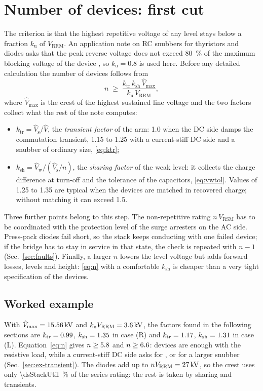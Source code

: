 \documentclass[10pt,a4paper]{scrartcl}
\newcommand{\Vrrm}{V_\mathrm{RRM}}
\newcommand{\Vrsm}{V_\mathrm{RSM}}
\newcommand{\Vh}{\hat V}
\newcommand{\Vs}{\hat V_\mathrm{s}}
\newcommand{\Vw}{\hat V_\mathrm{w}}
\newcommand{\ku}{k_\mathrm{u}}
\newcommand{\ktr}{k_\mathrm{tr}}
\newcommand{\ksh}{k_\mathrm{sh}}
\newcommand{\caseR}{(R)}
\newcommand{\caseL}{(L)}
\begin{document}
\section{Number of devices: first cut}
\label{sec:number}
The criterion is that the highest repetitive voltage of any level stays below a fraction $\ku$ of $\Vrrm$. An application note on RC snubbers for thyristors and diodes asks that the peak reverse voltage does not exceed \SI{80}{\percent} of the maximum blocking voltage of the device \cite[Sec.~4.4]{an6481}, so $\ku = 0.8$ is used here. Before any detailed calculation the number of devices follows from
\begin{equation}
n \;\ge\; \frac{\ktr\,\ksh\,\Vh_\mathrm{max}}{\ku\,\Vrrm},
\label{eq:n}
\end{equation}
where $\Vh_\mathrm{max}$ is the crest of the highest sustained line voltage and the two factors collect what the rest of the note computes:
\begin{itemize}
\item $\ktr = \Vs/\Vh$, the \emph{transient factor} of the arm: 1.0 when the DC side damps the commutation transient, 1.15 to 1.25 with a current-stiff DC side and a snubber of ordinary size, \eqref{eq:ktr};
\item $\ksh = \Vw/(\Vs/n)$, the \emph{sharing factor} of the weak level: it collects the charge difference at turn-off and the tolerance of the capacitors, \eqref{eq:vwtol}. Values of 1.25 to 1.35 are typical when the devices are matched in recovered charge; without matching it can exceed 1.5.
\end{itemize}
Three further points belong to this step. The non-repetitive rating $n\,\Vrsm$ has to be coordinated with the protection level of the surge arresters on the AC side. Press-pack diodes fail short, so the stack keeps conducting with one failed device; if the bridge has to stay in service in that state, the check is repeated with $n - 1$ (Sec.~\ref{sec:faults}). Finally, a larger $n$ lowers the level voltage but adds forward losses, levels and height: \eqref{eq:n} with a comfortable $\ksh$ is cheaper than a very tight specification of the devices.

\subsection{Worked example}
With $\Vh_\mathrm{max} = \SI{\dsVhatMax}{\kilo\volt}$ and $\ku\Vrrm = \SI{\dsKuVrrm}{\kilo\volt}$, the factors found in the following sections are $\ktr = \dsKtrR$, $\ksh = \dsKshR$ in case \caseR{} and $\ktr = \dsKtrL$, $\ksh = \dsKshL$ in case \caseL{}. Equation~\eqref{eq:n} gives $n \ge 5.8$ and $n \ge 6.6$: \dsNword{} devices are enough with the resistive load, while a current-stiff DC side asks for \dsNplusWord{}, or for a larger snubber (Sec.~\ref{sec:ex-transient}). The \dsNword{} diodes add up to $n\Vrrm = \SI{\dsNVrrm}{\kilo\volt}$, so the crest uses only \SI{\dsStackUtil}{\percent} of the series rating: the rest is taken by sharing and transients.
\end{document}
